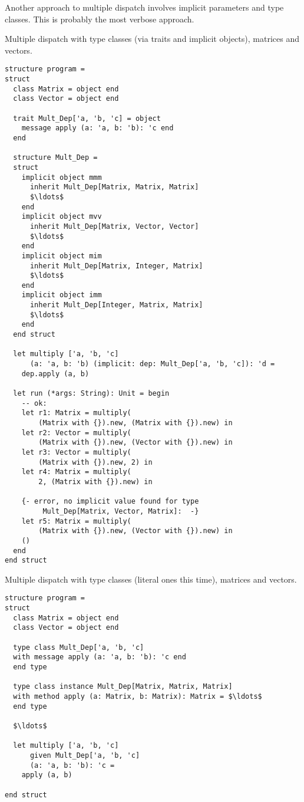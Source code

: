 Another approach to multiple dispatch involves implicit parameters and type classes. This is probably the most verbose approach. 

\example Multiple dispatch with type classes (via traits and implicit objects), matrices and vectors. 
\begin{lstlisting}
structure program =
struct
  class Matrix = object end
  class Vector = object end
  
  trait Mult_Dep['a, 'b, 'c] = object
    message apply (a: 'a, b: 'b): 'c end
  end
  
  structure Mult_Dep =
  struct
    implicit object mmm 
      inherit Mult_Dep[Matrix, Matrix, Matrix] 
      $\ldots$
    end
    implicit object mvv 
      inherit Mult_Dep[Matrix, Vector, Vector] 
      $\ldots$
    end
    implicit object mim 
      inherit Mult_Dep[Matrix, Integer, Matrix] 
      $\ldots$
    end
    implicit object imm 
      inherit Mult_Dep[Integer, Matrix, Matrix] 
      $\ldots$
    end
  end struct
  
  let multiply ['a, 'b, 'c]
      (a: 'a, b: 'b) (implicit: dep: Mult_Dep['a, 'b, 'c]): 'd =
    dep.apply (a, b)
  
  let run (*args: String): Unit = begin
    -- ok:
    let r1: Matrix = multiply(
        (Matrix with {}).new, (Matrix with {}).new) in
    let r2: Vector = multiply(
        (Matrix with {}).new, (Vector with {}).new) in
    let r3: Vector = multiply(
        (Matrix with {}).new, 2) in
    let r4: Matrix = multiply(
        2, (Matrix with {}).new) in
    
    {- error, no implicit value found for type
         Mult_Dep[Matrix, Vector, Matrix]:  -}
    let r5: Matrix = multiply(
        (Matrix with {}).new, (Vector with {}).new) in
    ()
  end
end struct
\end{lstlisting}

\example Multiple dispatch with type classes (literal ones this time), matrices and vectors. 
\begin{lstlisting}
structure program = 
struct
  class Matrix = object end
  class Vector = object end
  
  type class Mult_Dep['a, 'b, 'c] 
  with message apply (a: 'a, b: 'b): 'c end
  end type
  
  type class instance Mult_Dep[Matrix, Matrix, Matrix]
  with method apply (a: Matrix, b: Matrix): Matrix = $\ldots$
  end type 
  
  $\ldots$
  
  let multiply ['a, 'b, 'c] 
      given Mult_Dep['a, 'b, 'c] 
      (a: 'a, b: 'b): 'c =
    apply (a, b)

end struct
\end{lstlisting}






